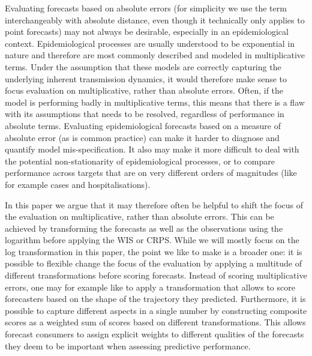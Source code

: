 \documentclass{article}
\begin{document}
Evaluating forecasts based on absolute errors (for simplicity we use the term interchangeably with absolute distance, even though it technically only applies to point forecasts) may not always be desirable, especially in an epidemiological context. 
Epidemiological processes are usually understood to be exponential in nature and therefore are most commonly described and modeled in multiplicative terms. Under the assumption that these models are correctly capturing the underlying inherent transmission dynamics, it would therefore make sense to focus evaluation on multiplicative, rather than absolute errors. Often, if the model is performing badly in multiplicative terms, this means that there is a flaw with its assumptions that needs to be resolved, regardless of performance in absolute terms. Evaluating epidemiological forecasts based on a measure of absolute error (as is common practice) can make it harder to diagnose and quantify model mis-specification. It also may make it more difficult to deal with the potential non-stationarity of epidemiological processes, or to compare performance across targets that are on very different orders of magnitudes (like for example cases and hospitalisations). 

In this paper we argue that it may therefore often be helpful to shift the focus of the evaluation on multiplicative, rather than absolute errors. This can be achieved by transforming the forecasts as well as the observations using the logarithm before applying the WIS or CRPS. While we will mostly focus on the log transformation in this paper, the point we like to make is a broader one: it is possible to flexible change the focus of the evaluation by applying a multitude of different transformations before scoring forecasts. Instead of scoring multiplicative errors, one may for example like to apply a transformation that allows to score forecasters based on the shape of the trajectory they predicted. Furthermore, it is possible to capture different aspects in a single number by constructing composite scores as a weighted sum of scores based on different transformations. This allows forecast consumers to assign explicit weights to different qualities of the forecasts they deem to be important when assessing predictive performance. 
\end{document}
